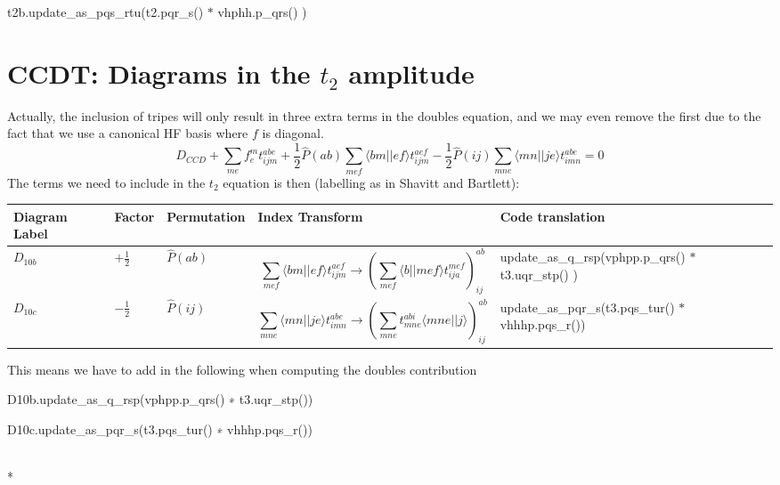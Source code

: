 \documentclass[letterpaper,10pt,english]{/Users/kinealicegulbrandsen/anaconda/lib/python2.7/site-packages/sphinx/texinputs/sphinxhowto}
\def\smaller{\fontsize{9.5pt}{9.5pt}\selectfont}
\newenvironment{ColorVerbatim}
        {\begin{mdframed}[%
            roundcorner=1.0pt, %
            backgroundcolor=nbframe-bg, %
            userdefinedwidth=1\linewidth, %
            leftmargin=0.1\linewidth, %
            innerleftmargin=0pt, %
            innerrightmargin=0pt, %
            linecolor=nbframe-border, %
            linewidth=1pt, %
            usetwoside=false, %
            everyline=true, %
            innerlinewidth=3pt, %
            innerlinecolor=nbframe-bg, %
            middlelinewidth=1pt, %
            middlelinecolor=nbframe-bg, %
            outerlinewidth=0.5pt, %
            outerlinecolor=nbframe-border, %
            needspace=0pt
        ]}
        {\end{mdframed}}
\renewenvironment{Verbatim}[1][\unskip]
        {\begin{alltt}\smaller}
        {\end{alltt}}
\begin{document}
t2b.update\_as\_pqs\_rtu(t2.pqr\_s() \(*\) vhphh.p\_qrs() )\section{CCDT: Diagrams in the \(t_2\)
amplitude}\label{ccdt-diagrams-in-the-tux5f2-amplitude}Actually, the inclusion of tripes will only result in three extra terms
in the doubles equation, and we may even remove the first due to the
fact that we use a canonical HF basis where \(f\) is diagonal.\[ D_{CCD} + \sum_{me} f^m_e t^{abe}_{ijm} + \frac{1}{2} \hat{P}(ab) \sum_{mef} \langle bm \vert \vert ef \rangle t^{aef}_{ijm}  - \frac{1}{2}\hat{P}(ij) \sum_{mne} \langle mn \vert \vert je \rangle t^{abe}_{imn} = 0 \]The terms we need to include in the \(t_2\) equation is then (labelling
as in Shavitt and Bartlett):\begin{longtable}[c]{@{}lllll@{}}
\toprule
Diagram Label & Factor & Permutation & Index Transform & Code
translation\tabularnewline
\midrule
\endhead
\(D_{10b}\) & \(+\frac{1}{2}\) & \(\hat{P}(ab)\) &
\[\sum_{mef} \langle bm \vert \vert ef \rangle t^{aef}_{ijm} \rightarrow (\sum_{mef} \langle b \vert \vert mef \rangle t^{mef}_{ija})^{ab}_{ij} \]
& update\_as\_q\_rsp(vphpp.p\_qrs() \(*\) t3.uqr\_stp() )\tabularnewline
\(D_{10c}\) & \(-\frac{1}{2}\) & \(\hat{P}(ij)\) &
\[\sum_{mne} \langle mn \vert \vert je \rangle t^{abe}_{imn} \rightarrow (\sum_{mne} t^{abi}_{mne} \langle mne \vert \vert j \rangle)^{ab}_{ij}  \]
& update\_as\_pqr\_s(t3.pqs\_tur() \(*\) vhhhp.pqs\_r())\tabularnewline
\bottomrule
\end{longtable}This means we have to add in the following when computing the doubles
contribution

D10b.update\_as\_q\_rsp(vphpp.p\_qrs() ∗ t3.uqr\_stp())

D10c.update\_as\_pqr\_s(t3.pqs\_tur() ∗ vhhhp.pqs\_r())


    
        \vspace{6pt}
        \makebox[0.1\linewidth]{\smaller\hfill\tt\color{nbframe-in-prompt}In\hspace{4pt}{[}{]}:\hspace{4pt}}\\*
        \vspace{-2.65\baselineskip}
        \begin{ColorVerbatim}
            \vspace{-0.7\baselineskip}
            \begin{Verbatim}[commandchars=\\\{\}]

\end{Verbatim}

            
                \vspace{0.3\baselineskip}
            
        \end{ColorVerbatim}
    

        

        \renewcommand{\indexname}{Index}
        \printindex

    
\end{document}
